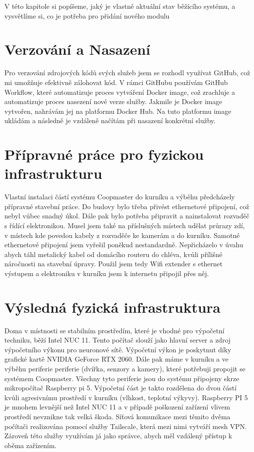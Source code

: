 V této kapitole si popíšeme, jaký je vlastně aktuální stav běžícího systému, a vysvětlíme si, co je potřeba pro přidání nového modulu
\section*{Verzování a Nasazení}

Pro verzování zdrojových kódů svých služeb jsem se rozhodl využívat GitHub, což mi umožňuje efektivně zálohovat kód.
V rámci GitHubu používám GitHub Workflow, které automatizuje proces vytváření Docker image, což zrachluje a automatizuje proces nasezení nové verze služby.
Jakmile je Docker image vytvořen, nahrávám jej na platformu Docker Hub.
Na tuto platformu image ukládám a následně je vzdáleně načítám při nasazení konkrétní služby.
\section*{Přípravné práce pro fyzickou infrastrukturu}

Vlastní instalaci částí systému Coopmaster do kurníku a výběhu předcházely přípravné stavební práce.
Do budovy bylo třeba přivést ethernetové připojení, což nebyl vůbec snadný úkol.
Dále pak bylo potřeba připravit a nainstalovat rozvaděč s řídící elektronikou.
Musel jsem také na příslušných místech udělat průrazy zdí, v místech kde povedou kabely z rozvaděče ke kamerám a do kurníku.
Samotné ethernetové připojení jsem vyřešil poněkud nestandardně.
Nepřicházelo v úvahu abych táhl metalický kabel od domácího routeru do chléva, kvůli přílišné náročnosti na stavební úpravy.
Použil jsem tedy Wifi extender s ethernet výstupem a elektroniku v kurníku jsem k internetu připojil přes něj.
\section*{Výsledná fyzická infrastruktura}

Doma v místnosti se stabilním prostředím, které je vhodné pro výpočetní techniku, běží Intel NUC 11.
Tento počítač slouží jako hlavní server a zdroj výpočetního výkonu pro neuronové sítě.
Výpočetní výkon je poskytnut díky grafické kartě NVIDIA GeForce RTX 2060.\newline
Dále pak máme v kurníku a ve výběhu periferie periferie (dvířka, senzory a kamery), které potřebuji propojit se systémem Coopmaster.
Všechny tyto periferie jsou do systému připojeny skrze mikropočítač Raspberry pi 5.
Výpočetní část je takto rozdělena do dvou částí kvůli agresivnímu prostředí v kurníku (vlhkost, teplotní výkyvy).
Raspberry PI 5 je mnohem levnější než Intel NUC 11 a v případě poškození zařízení vlivem prostředí nevznikne tak velká škoda.
Síťová komunikace mezi těmito dvěma počítači realizována pomocí služby Tailscale, která mezi nimi vytváří mesh VPN.
Zároveň této služby využívám já jako správce, abych měl vzdálený přístup k oběma zařízením.

